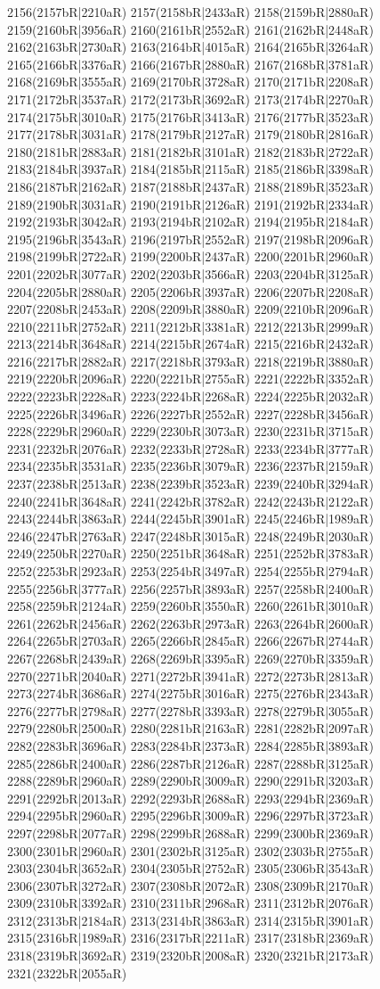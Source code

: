 2156(2157bR|2210aR) 2157(2158bR|2433aR) 2158(2159bR|2880aR) 2159(2160bR|3956aR) 2160(2161bR|2552aR) 2161(2162bR|2448aR) 2162(2163bR|2730aR) 2163(2164bR|4015aR) 2164(2165bR|3264aR) 2165(2166bR|3376aR) 2166(2167bR|2880aR) 2167(2168bR|3781aR) 2168(2169bR|3555aR) 2169(2170bR|3728aR) 2170(2171bR|2208aR) 2171(2172bR|3537aR) 2172(2173bR|3692aR) 2173(2174bR|2270aR) 2174(2175bR|3010aR) 2175(2176bR|3413aR) 2176(2177bR|3523aR) 2177(2178bR|3031aR) 2178(2179bR|2127aR) 2179(2180bR|2816aR) 2180(2181bR|2883aR) 2181(2182bR|3101aR) 2182(2183bR|2722aR) 2183(2184bR|3937aR) 2184(2185bR|2115aR) 2185(2186bR|3398aR) 2186(2187bR|2162aR) 2187(2188bR|2437aR) 2188(2189bR|3523aR) 2189(2190bR|3031aR) 2190(2191bR|2126aR) 2191(2192bR|2334aR) 2192(2193bR|3042aR) 2193(2194bR|2102aR) 2194(2195bR|2184aR) 2195(2196bR|3543aR) 2196(2197bR|2552aR) 2197(2198bR|2096aR) 2198(2199bR|2722aR) 2199(2200bR|2437aR) 2200(2201bR|2960aR) 2201(2202bR|3077aR) 2202(2203bR|3566aR) 2203(2204bR|3125aR) 2204(2205bR|2880aR) 2205(2206bR|3937aR) 2206(2207bR|2208aR) 2207(2208bR|2453aR) 2208(2209bR|3880aR) 2209(2210bR|2096aR) 2210(2211bR|2752aR) 2211(2212bR|3381aR) 2212(2213bR|2999aR) 2213(2214bR|3648aR) 2214(2215bR|2674aR) 2215(2216bR|2432aR) 2216(2217bR|2882aR) 2217(2218bR|3793aR) 2218(2219bR|3880aR) 2219(2220bR|2096aR) 2220(2221bR|2755aR) 2221(2222bR|3352aR) 2222(2223bR|2228aR) 2223(2224bR|2268aR) 2224(2225bR|2032aR) 2225(2226bR|3496aR) 2226(2227bR|2552aR) 2227(2228bR|3456aR) 2228(2229bR|2960aR) 2229(2230bR|3073aR) 2230(2231bR|3715aR) 2231(2232bR|2076aR) 2232(2233bR|2728aR) 2233(2234bR|3777aR) 2234(2235bR|3531aR) 2235(2236bR|3079aR) 2236(2237bR|2159aR) 2237(2238bR|2513aR) 2238(2239bR|3523aR) 2239(2240bR|3294aR) 2240(2241bR|3648aR) 2241(2242bR|3782aR) 2242(2243bR|2122aR) 2243(2244bR|3863aR) 2244(2245bR|3901aR) 2245(2246bR|1989aR) 2246(2247bR|2763aR) 2247(2248bR|3015aR) 2248(2249bR|2030aR) 2249(2250bR|2270aR) 2250(2251bR|3648aR) 2251(2252bR|3783aR) 2252(2253bR|2923aR) 2253(2254bR|3497aR) 2254(2255bR|2794aR) 2255(2256bR|3777aR) 2256(2257bR|3893aR) 2257(2258bR|2400aR) 2258(2259bR|2124aR) 2259(2260bR|3550aR) 2260(2261bR|3010aR) 2261(2262bR|2456aR) 2262(2263bR|2973aR) 2263(2264bR|2600aR) 2264(2265bR|2703aR) 2265(2266bR|2845aR) 2266(2267bR|2744aR) 2267(2268bR|2439aR) 2268(2269bR|3395aR) 2269(2270bR|3359aR) 2270(2271bR|2040aR) 2271(2272bR|3941aR) 2272(2273bR|2813aR) 2273(2274bR|3686aR) 2274(2275bR|3016aR) 2275(2276bR|2343aR) 2276(2277bR|2798aR) 2277(2278bR|3393aR) 2278(2279bR|3055aR) 2279(2280bR|2500aR) 2280(2281bR|2163aR) 2281(2282bR|2097aR) 2282(2283bR|3696aR) 2283(2284bR|2373aR) 2284(2285bR|3893aR) 2285(2286bR|2400aR) 2286(2287bR|2126aR) 2287(2288bR|3125aR) 2288(2289bR|2960aR) 2289(2290bR|3009aR) 2290(2291bR|3203aR) 2291(2292bR|2013aR) 2292(2293bR|2688aR) 2293(2294bR|2369aR) 2294(2295bR|2960aR) 2295(2296bR|3009aR) 2296(2297bR|3723aR) 2297(2298bR|2077aR) 2298(2299bR|2688aR) 2299(2300bR|2369aR) 2300(2301bR|2960aR) 2301(2302bR|3125aR) 2302(2303bR|2755aR) 2303(2304bR|3652aR) 2304(2305bR|2752aR) 2305(2306bR|3543aR) 2306(2307bR|3272aR) 2307(2308bR|2072aR) 2308(2309bR|2170aR) 2309(2310bR|3392aR) 2310(2311bR|2968aR) 2311(2312bR|2076aR) 2312(2313bR|2184aR) 2313(2314bR|3863aR) 2314(2315bR|3901aR) 2315(2316bR|1989aR) 2316(2317bR|2211aR) 2317(2318bR|2369aR) 2318(2319bR|3692aR) 2319(2320bR|2008aR) 2320(2321bR|2173aR) 2321(2322bR|2055aR) 